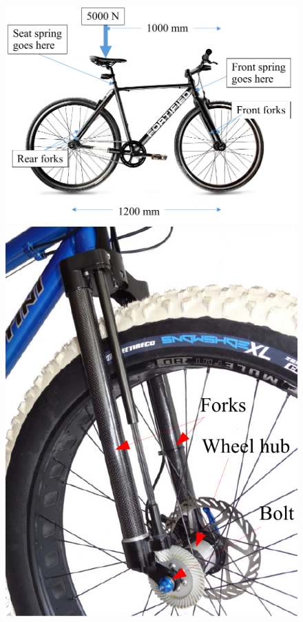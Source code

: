 \documentclass[
10pt,
a4paper,
openany,
svgnames,
]{book}
\begin{document}
\begin{exercises}
  \begin{figure}[h]
    \centering
    \includegraphics[scale=0.72]{pictures/Machine-interaction/bicycle-dimension} \\
    \includegraphics[scale=0.6]{pictures/Machine-interaction/bicycle-fork} \hspace{1cm}

\end{figure}
\end{exercises}
\end{document}

